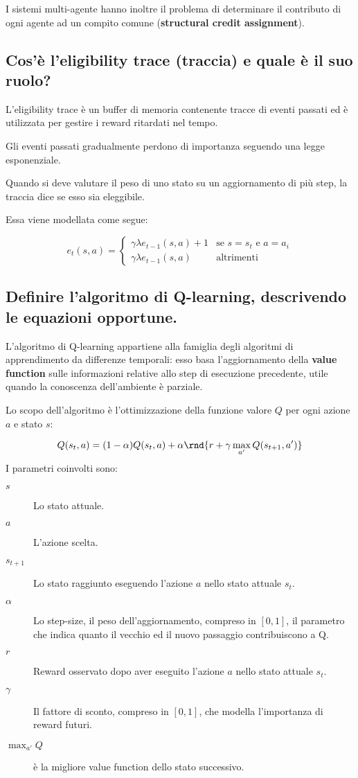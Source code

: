 \documentclass[\main/main.tex]{subfiles}
\begin{document}
I sistemi multi-agente hanno inoltre il problema di determinare il contributo di ogni agente ad un compito comune (\textbf{structural credit assignment}).

\subsection{Cos'è l'eligibility trace (traccia) e quale è il suo ruolo?}
L'eligibility trace è un buffer di memoria contenente tracce di eventi passati ed è utilizzata per gestire i reward ritardati nel tempo.

Gli eventi passati gradualmente perdono di importanza seguendo una legge esponenziale.

Quando si deve valutare il peso di uno stato su un aggiornamento di più step, la traccia dice se esso sia eleggibile.

Essa viene modellata come segue:

\[
  e_t(s,a) = \begin{cases}
    \gamma \lambda e_{t-1} (s,a) + 1 & \text{se } s=s_t \text{ e } a = a_i \\
    \gamma \lambda e_{t-1} (s,a)     & \text{altrimenti}
  \end{cases}
\]

\subsection{Definire l'algoritmo di Q-learning, descrivendo le equazioni opportune.}
L'algoritmo di Q-learning appartiene alla famiglia degli algoritmi di apprendimento da differenze temporali: esso basa l'aggiornamento della \textbf{value function} sulle informazioni relative allo step di esecuzione precedente, utile quando la conoscenza dell'ambiente è parziale.

Lo scopo dell'algoritmo è l'ottimizzazione della funzione valore $Q$ per ogni azione $a$ e stato $s$:

\[
  Q(s_t,a) = (1-\alpha)Q(s_t,a) + \alpha\rnd{r+\gamma\max_{a'}Q(s_{t+1},a')}
\]
I parametri coinvolti sono:
\begin{description}
  \item[$s$] Lo stato attuale.
  \item[$a$] L'azione scelta.
  \item[$s_{t+1}$] Lo stato raggiunto eseguendo l'azione $a$ nello stato attuale $s_t$.
  \item[$\alpha$] Lo step-size, il peso dell'aggiornamento, compreso in $[0,1]$, il parametro che indica quanto il vecchio ed il nuovo passaggio contribuiscono a Q.
  \item[$r$] Reward osservato dopo aver eseguito l'azione $a$ nello stato attuale $s_t$.
  \item[$\gamma$] Il fattore di sconto, compreso in $[0,1]$, che modella l'importanza di reward futuri.
  \item[$\max_{a'}Q$] è la migliore value function dello stato successivo.
\end{description}
\end{document}
